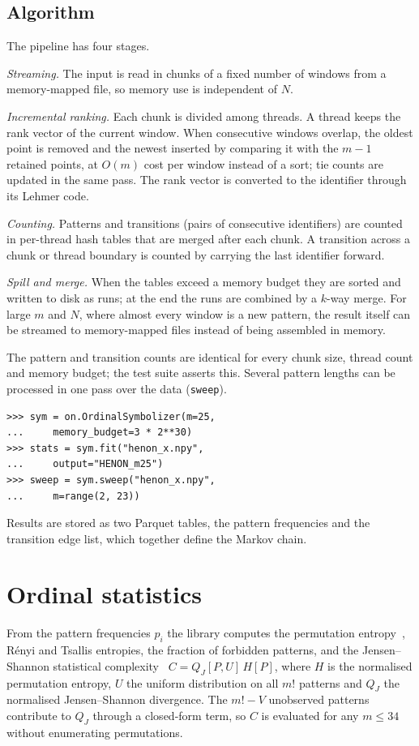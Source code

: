 \documentclass[aip,cha,reprint,amsmath,amssymb]{revtex4-2}
\newcommand{\code}[1]{\texttt{#1}}
\begin{document}
\subsection{Algorithm}

The pipeline has four stages.

\emph{Streaming.} The input is read in chunks of a fixed number of windows from a
memory-mapped file, so memory use is independent of $N$.

\emph{Incremental ranking.} Each chunk is divided among threads. A thread keeps the
rank vector of the current window. When consecutive windows overlap, the oldest point
is removed and the newest inserted by comparing it with the $m-1$ retained points, at
$O(m)$ cost per window instead of a sort; tie counts are updated in the same pass. The
rank vector is converted to the identifier through its Lehmer code.

\emph{Counting.} Patterns and transitions (pairs of consecutive identifiers) are
counted in per-thread hash tables that are merged after each chunk. A transition across
a chunk or thread boundary is counted by carrying the last identifier forward.

\emph{Spill and merge.} When the tables exceed a memory budget they are sorted and
written to disk as runs; at the end the runs are combined by a $k$-way merge. For large
$m$ and $N$, where almost every window is a new pattern, the result itself can be
streamed to memory-mapped files instead of being assembled in memory.

The pattern and transition counts are identical for every chunk size, thread count
and memory budget; the test suite asserts this. Several pattern lengths can be
processed in one pass over the data (\code{sweep}).

\begin{verbatim}
>>> sym = on.OrdinalSymbolizer(m=25,
...     memory_budget=3 * 2**30)
>>> stats = sym.fit("henon_x.npy",
...     output="HENON_m25")
>>> sweep = sym.sweep("henon_x.npy",
...     m=range(2, 23))
\end{verbatim}

Results are stored as two Parquet tables, the pattern frequencies and the transition
edge list, which together define the Markov chain.

\section{Ordinal statistics}

From the pattern frequencies $p_i$ the library computes the permutation
entropy~\cite{bandt2002}, R\'enyi and Tsallis entropies, the fraction of forbidden
patterns, and the Jensen--Shannon statistical complexity~\cite{lamberti2004,rosso2007}
$C = Q_J[P, U]\,H[P]$, where $H$ is the normalised permutation entropy, $U$ the uniform
distribution on all $m!$ patterns and $Q_J$ the normalised Jensen--Shannon divergence.
The $m! - V$ unobserved patterns contribute to $Q_J$ through a closed-form term, so $C$
is evaluated for any $m \le 34$ without enumerating permutations.
\end{document}
